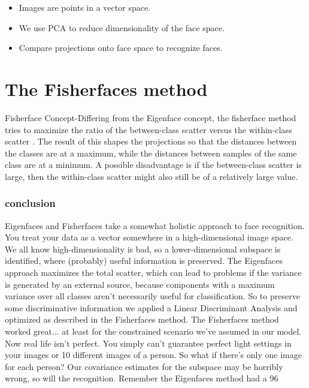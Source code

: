 \documentclass[a4paper,12pt]{report}
\begin{document}
				\begin{itemize}
				      \item {Images are points in a vector space.} 
				      \item {We use PCA to reduce dimensionality of the face space.} 
				      \item {Compare projections onto face space to recognize faces.}
				\end{itemize}
				
				
			
	\section{The Fisherfaces method}
				Fisherface Concept-Differing from the Eigenface concept, the fisherface method tries to maximize the ratio of the between-class scatter versus the within-class scatter . The result of this shapes the projections so that the distances between the classes are at a maximum, while the distances between samples of the same class are at a minimum. A possible disadvantage is if the between-class scatter is large, then the within-class scatter might also still be of a relatively large value.
			
				\subsubsection{conclusion}
				Eigenfaces and Fisherfaces take a somewhat holistic approach to face recognition. You treat your data as a vector somewhere in a high-dimensional image space. We all know high-dimensionality is bad, so a lower-dimensional subspace is identified, where (probably) useful information is preserved. The Eigenfaces approach maximizes the total scatter, which can lead to problems if the variance is generated by an external source, because components with a maximum variance over all classes aren’t necessarily useful for classification. So to preserve some discriminative information we applied a Linear Discriminant Analysis and optimized as described in the Fisherfaces method. The Fisherfaces method worked great... at least for the constrained scenario we’ve assumed in our model.
				Now real life isn’t perfect. You simply can’t guarantee perfect light settings in your images or 10 different images of a person. So what if there’s only one image for each person? Our covariance estimates for the subspace may be horribly wrong, so will the recognition. Remember the Eigenfaces method had a 96%
				
\end{document}
